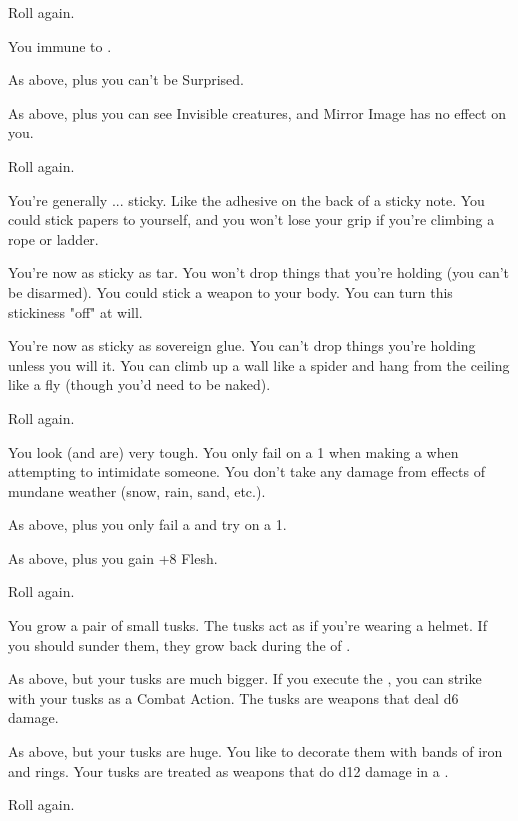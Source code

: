 \begin{multicols*}{2}
  Roll again.

\NC[Name=Spider Eyes]

  You immune to .

  As above, plus you can't be Surprised.

  As above, plus you can see Invisible creatures, and Mirror Image has no effect on you.

  Roll again.


\NC[Name=Sticky]

 You're generally ... sticky.  Like the adhesive on the back of a sticky note.  You could stick papers to yourself, and you won't lose your grip if you're climbing a rope or ladder.

 You're now as sticky as tar.  You won't drop things that you're holding (you can't be disarmed).  You could stick a weapon to your body.  You can turn this stickiness "off" at will.

 You're now as sticky as sovereign glue.  You can't drop things you're holding unless you will it.  You can climb up a wall like a spider and hang from the ceiling like a fly (though you'd need to be naked).

 Roll again.

\cbreak



\NC[Name=Tough'un]

   You look (and are) very tough.  You only fail on a 1 when making a \RSTRY{\PRE} when attempting to intimidate someone.  You don't take any damage from effects of mundane weather (snow, rain, sand, etc.).

 As above, plus you only fail a \DEATH and \INJURY try on a 1.

 As above, plus you gain +8 Flesh.

 Roll again.

\NC[Name=Tusky]

  You grow a pair of small tusks.  The tusks act as if you're wearing a helmet.  If you should sunder them, they grow back during the  of .

  As above, but your tusks are much bigger.  If you execute the , you can strike with your tusks as a Combat Action.  The tusks are \VIG weapons that deal d6 damage.

  As above, but your tusks are huge.  You like to decorate them with bands of iron and rings.  Your tusks are treated as \VIG weapons that do d12 damage in a .

  Roll again.

\newpage

\end{multicols*}
